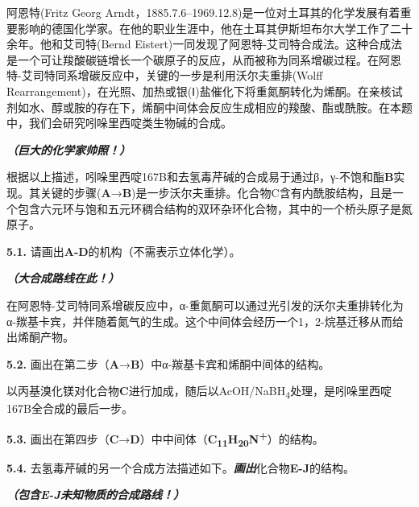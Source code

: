 阿恩特(Fritz Georg Arndt，1885.7.6--1969.12.8)是一位对土耳其的化学发展有着重要影响的德国化学家。在他的职业生涯中，他在土耳其伊斯坦布尔大学工作了二十余年。他和艾司特(Bernd Eistert)一同发现了阿恩特-艾司特合成法。这种合成法是一个可让羧酸碳链增长一个碳原子的反应，从而被称为同系增碳过程。在阿恩特-艾司特同系增碳反应中，关键的一步是利用沃尔夫重排(Wolff Rearrangement)，在光照、加热或银(Ⅰ)盐催化下将重氮酮转化为烯酮。在亲核试剂如水、醇或胺的存在下，烯酮中间体会反应生成相应的羧酸、酯或酰胺。在本题中，我们会研究吲哚里西啶类生物碱的合成。

\textbf{\emph{（巨大的化学家帅照！）}}

根据以上描述，吲哚里西啶167B和去氢毒芹碱的合成易于通过β，γ-不饱和酯\textbf{B}实现。其关键的步骤(\textbf{A}→\textbf{B})是一步沃尔夫重排。化合物C含有内酰胺结构，且是一个包含六元环与饱和五元环稠合结构的双环杂环化合物，其中的一个桥头原子是氮原子。

\noindent\textbf{5.1.} 请画出\textbf{A-D}的机构（不需表示立体化学）。

\textbf{\emph{（大合成路线在此！）}}

在阿恩特-艾司特同系增碳反应中，α-重氮酮可以通过光引发的沃尔夫重排转化为α-羰基卡宾，并伴随着氮气的生成。这个中间体会经历一个1，2-烷基迁移从而给出烯酮产物。

\noindent\textbf{5.2.}
画出在第二步（\textbf{A}→\textbf{B}）中α-羰基卡宾和烯酮中间体的结构。

以丙基溴化镁对化合物\textbf{C}进行加成，随后以AcOH/NaBH\textsubscript{4}处理，是吲哚里西啶167B全合成的最后一步。

\noindent\textbf{5.3.}
画出在第四步（\textbf{C}→\textbf{D}）中中间体（\textbf{C\textsubscript{11}H\textsubscript{20}N\textsuperscript{+}}）的结构。

\noindent\textbf{5.4.}
去氢毒芹碱的另一个合成方法描述如下。\textbf{\emph{画出}}化合物\textbf{E-J}的结构。

\textbf{\emph{（包含E-J未知物质的合成路线！）}}
